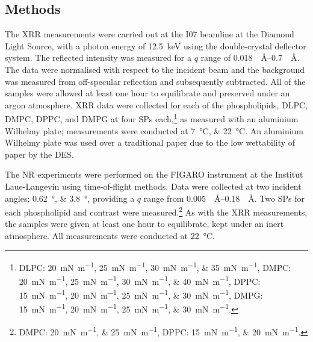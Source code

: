 \subsection{Methods}
The XRR measurements were carried out at the I07 beamline at the Diamond Light Source, with a photon energy of \SI{12.5}{\kilo\electronvolt} using the double-crystal deflector system.
The reflected intensity was measured for a $q$ range of \SIrange{0.018}{0.7}{\per\angstrom}.
The data were normalised with respect to the incident beam and the background was measured from off-specular reflection and subsequently subtracted.
All of the samples were allowed at least one hour to equilibrate and preserved under an argon atmosphere.
XRR data were collected for each of the phospholipids, DLPC, DMPC, DPPC, and DMPG at four SPs each,\footnote{DLPC: \SIlist{20;25;30;35}{\milli\newton\per\meter}, DMPC: \SIlist{20;25;30;40}{\milli\newton\per\meter}, DPPC: \SIlist{15;20;25;30}{\milli\newton\per\meter}, DMPG: \SIlist{15;20;25;30}{\milli\newton\per\meter}.} as measured with an aluminium Wilhelmy plate; measurements were conducted at \SIlist{7;22}{\celsius}.
An aluminium Wilhelmy plate was used over a traditional paper due to the low wettability of paper by the DES.

The NR experiments were performed on the FIGARO instrument at the Institut Laue-Langevin using time-of-flight methods.
Data were collected at two incident angles; \SIlist{0.62;3.8}{\degree}, providing a $q$ range from \SIrange{0.005}{0.18}{\per\angstrom}.
Two SPs for each phospholipid and contrast were measured.\footnote{DMPC: \SIlist{20;25}{\milli\newton\per\meter}, DPPC: \SIlist{15;20}{\milli\newton\per\meter}.}
As with the XRR measurements, the samples were given at least one hour to equilibrate, kept under an inert atmosphere.
All measurements were conducted at \SI{22}{\celsius}.

